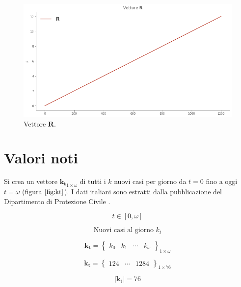 \documentclass[11pt]{article}
\begin{document}
    
    \begin{figure}
    \centering
        \includegraphics{vettorer.png}
        \caption{Vettore $\mathbf{R}$.}
        \label{fig:vettorer}
    \end{figure}

    
    \hypertarget{valori-noti}{%
\section{Valori noti}\label{valori-noti}}

    Si crea un vettore \(\mathbf{k_t}_{1\times \omega}\) di tutti i \(k\)
nuovi casi per giorno da \(t=0\) fino a oggi \(t=\omega\) (figura
\(\ref{fig:kt}\)). I dati italiani sono estratti dalla pubblicazione del
Dipartimento di Protezione Civile \cite{pcm_dpc_2020}.

    \[ t \in [0, \omega] \]

\[ \textrm{Nuovi casi al giorno } k_t \]

\[ \mathbf{k_t} = \begin{Bmatrix}
k_0 & k_1 & \cdots & k_\omega
\end{Bmatrix}_{1\times\omega} \]

    \[\mathbf{k_t} = \begin{Bmatrix} 124 & \cdots & 1284 \end{Bmatrix}_{1 \times 76}\]

    
    \[| \mathbf{k_t} | = 76\]

    
    
\end{document}
